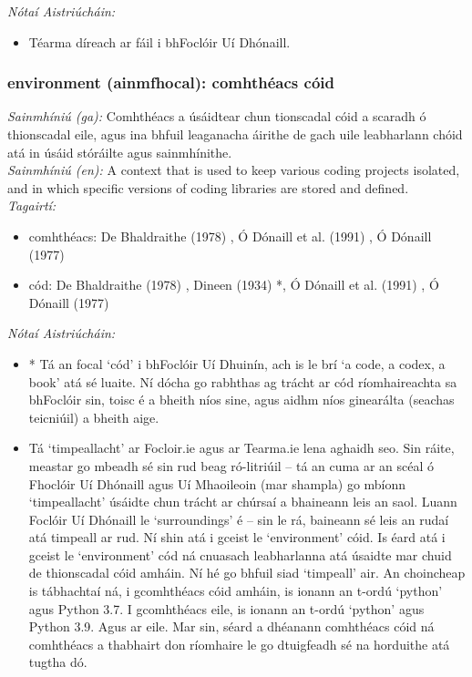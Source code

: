  \noindent \textit{Nótaí Aistriúcháin:}
\begin{itemize}
	\item Téarma díreach ar fáil i bhFoclóir Uí Dhónaill.
\end{itemize}


\subsubsection*{environment (ainmfhocal): comhthéacs cóid}
 \noindent \textit{Sainmhíniú (ga):} Comhthéacs a úsáidtear chun tionscadal cóid a scaradh ó thionscadal eile, agus ina bhfuil leaganacha áirithe de gach uile leabharlann chóid atá in úsáid stóráilte agus sainmhínithe.
\\
 \noindent \textit{Sainmhíniú (en):} A context that is used to keep various coding projects isolated, and in which specific versions of coding libraries are stored and defined.
\\
 \noindent \textit{Tagairtí:}
\begin{itemize}
	\item comhthéacs: De Bhaldraithe (1978) \cite{de-bhaldraithe}, Ó Dónaill et al. (1991) \cite{focloir-beag}, Ó Dónaill (1977) \cite{odonaill}
	\item cód: De Bhaldraithe (1978) \cite{de-bhaldraithe}, Dineen (1934) \cite{dineen}*, Ó Dónaill et al. (1991) \cite{focloir-beag}, Ó Dónaill (1977) \cite{odonaill}
\end{itemize}

 \noindent \textit{Nótaí Aistriúcháin:}
\begin{itemize}
	\item * Tá an focal `cód' i bhFoclóir Uí Dhuinín, ach is le brí `a code, a codex, a book' atá sé luaite. Ní dócha go rabhthas ag trácht ar cód ríomhaireachta sa bhFoclóir sin, toisc é a bheith níos sine, agus aidhm níos ginearálta (seachas teicniúil) a bheith aige.
	\item Tá `timpeallacht' ar Focloir.ie agus ar Tearma.ie lena aghaidh seo. Sin ráite, meastar go mbeadh sé sin rud beag ró-litriúil -- tá an cuma ar an scéal ó Fhoclóir Uí Dhónaill agus Uí Mhaoileoin (mar shampla) go mbíonn `timpeallacht' úsáidte chun trácht ar chúrsaí a bhaineann leis an saol. Luann Foclóir Uí Dhónaill le `surroundings' é -- sin le rá, baineann sé leis an rudaí atá timpeall ar rud. Ní shin atá i gceist le `environment' cóid. Is éard atá i gceist le `environment' cód ná cnuasach leabharlanna atá úsaidte mar chuid de thionscadal cóid amháin. Ní hé go bhfuil siad `timpeall' air. An choincheap is tábhachtaí ná, i gcomhthéacs cóid amháin, is ionann an t-ordú `python' agus Python 3.7. I gcomhthéacs eile, is ionann an t-ordú `python' agus Python 3.9. Agus ar eile. Mar sin, séard a dhéanann comhthéacs cóid ná comhthéacs a thabhairt don ríomhaire le go dtuigfeadh sé na horduithe atá tugtha dó.
\end{itemize}


